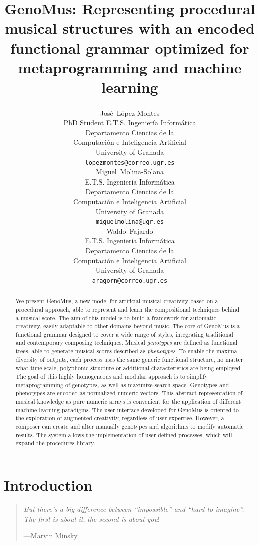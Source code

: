 \documentclass{article}
\title{GenoMus: Representing procedural musical structures with an encoded functional grammar optimized for metaprogramming and machine learning}
\author{
  Jos\'e~L\'opez-Montes\textsuperscript{\Letter} \\
  PhD Student E.T.S. Ingenier\'{i}a Inform\'{a}tica\\
  Departamento Ciencias de la\\Computaci\'{o}n e Inteligencia Artificial\\
  University of Granada\\
  \texttt{lopezmontes@correo.ugr.es}\\   
  \And
  Miguel~Molina-Solana \\
  E.T.S. Ingenier\'{i}a Inform\'{a}tica\\
  Departamento Ciencias de la\\Computaci\'{o}n e Inteligencia Artificial\\
  University of Granada\\
  \texttt{miguelmolina@ugr.es} \\ 
  \And
  Waldo~Fajardo \\
  E.T.S. Ingenier\'{i}a Inform\'{a}tica\\
  Departamento Ciencias de la\\Computaci\'{o}n e Inteligencia Artificial\\
  University of Granada\\  
  \texttt{aragorn@correo.ugr.es} \\
}
\begin{document}
\maketitle

\begin{abstract}

 	
We present GenoMus, a new model for artificial musical creativity based on a procedural approach, able to represent and learn the compositional techniques behind a musical score. The aim of this model is to build a framework for automatic creativity, easily adaptable to other domains beyond music. The core of GenoMus is a functional grammar designed to cover a wide range of styles, integrating traditional and contemporary composing techniques. Musical \emph{genotypes} are defined as functional trees, able to generate musical scores described as \emph{phenotypes}. To enable the maximal diversity of outputs, each process uses the same generic functional structure, no matter what time scale, polyphonic structure or additional characteristics are being employed. The goal of this highly homogeneous and modular approach is to simplify metaprogramming of genotypes, as well as maximize search space. Genotypes and phenotypes are encoded as normalized numeric vectors. This abstract representation of musical knowledge as pure numeric arrays is convenient for the application of different machine learning paradigms. The user interface developed for GenoMus is oriented to the exploration of augmented creativity, regardless of user expertise. However, a composer can create and alter manually genotypes and algorithms to modify automatic results. The system allows the implementation of user-defined processes, which will expand the procedures library. 

\end{abstract}




\setcounter{tocdepth}{2}
\tableofcontents
\bigskip



\section{Introduction}

\begin{samepage}
\begin{quotation}
\textsl{But there's a big difference between ``impossible'' and ``hard to imagine''. The first is about} \emph{it}; \textsl{the second is about} \emph{you}!

---Marvin Minsky \cite{DBLP:journals/aim/Minsky82}
\end{quotation}
\end{samepage}
\end{document}
